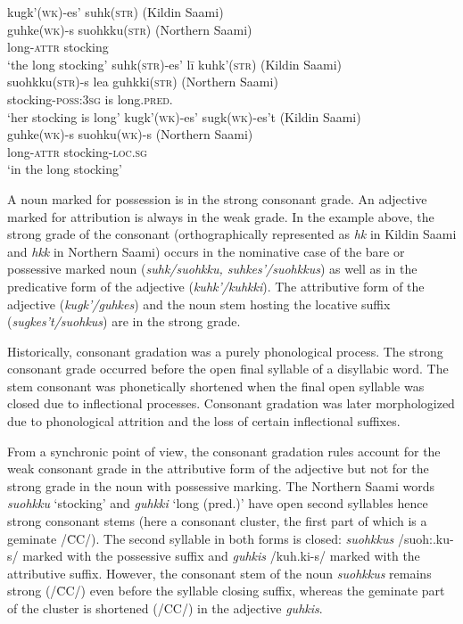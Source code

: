 {\begin{exe}
\begin{xlist}
\ex 
\glll 	kugk'(\textsc{wk})-es' suhk(\textsc{str}) {(Kildin Saami)} \\
	guhke(\textsc{wk})-s suohkku(\textsc{str}) {(Northern Saami)}\\
	long-\textsc{attr} stocking\\
\glt	‘the long stocking’
\ex 
\glll	suhk(\textsc{str})-es' lī kuhk'(\textsc{str}) {(Kildin Saami)}\\
	suohkku(\textsc{str})-s lea guhkki(\textsc{str}) {(Northern Saami)}\\
	stocking-\textsc{poss:3sg} is long.\textsc{pred.}\\
\glt	‘her stocking is long’
\ex
\glll	kugk'(\textsc{wk})-es' sugk(\textsc{wk})-es't {(Kildin Saami)}\\
	guhke(\textsc{wk})-s suohku(\textsc{wk})-s {(Northern Saami)}\\
	long-\textsc{attr} stocking-\textsc{loc.sg}\\
\glt	‘in the long stocking’
\end{xlist}
\end{exe}
A noun marked for possession is in the strong consonant grade. An adjective marked for attribution is always in the weak grade. In the example above, the strong grade of the consonant (orthographically represented as \textit{hk} in Kildin Saami and \textit{hkk} in Northern Saami) occurs in the nominative case of the bare or possessive marked noun (\textit{suhk/suohkku, suhkes'/suohkkus}) as well as in the predicative form of the adjective (\textit{kuhk'/kuhkki}). The attributive form of the adjective (\textit{kugk'/guhkes}) and the noun stem hosting the locative suffix (\textit{sugkes't/suohkus}) are in the strong grade.

Historically, consonant gradation was a purely phonological process. The strong consonant grade occurred before the open final syllable of a disyllabic word. The stem consonant was phonetically shortened when the final open syllable was closed due to inflectional processes. Consonant gradation was later morphologized due to phonological attrition and the loss of certain inflectional suffixes.

From a synchronic point of view, the consonant gradation rules account for the weak consonant grade in the attributive form of the adjective but not for the strong grade in the noun with possessive marking. The Northern Saami words \textit{suohkku} ‘stocking’ and \textit{guhkki} ‘long (pred.)’ have open second syllables hence strong consonant stems (here a consonant cluster, the first part of which is a geminate /\=CC/). The second syllable in both forms is closed: \textit{suohkkus} /suoh:.ku-s/ marked with the possessive suffix and \textit{guhkis} /kuh.ki-s/ marked with the attributive suffix. However, the consonant stem of the noun \textit{suohkkus} remains strong (/\=CC/) even before the syllable closing suffix, whereas the geminate part of the cluster is shortened (/CC/) in the adjective \textit{guhkis}.

}

